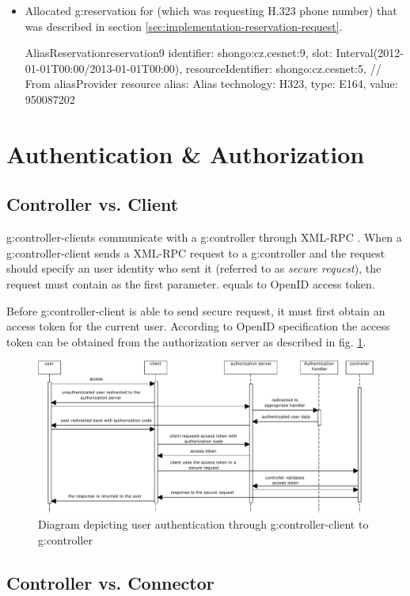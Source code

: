 \begin{itemize}
\item Allocated \gls{g:reservation} for \hyperref[oc:request4]{} (which was requesting H.323 phone number) that was described in section \ref{sec:implementation-reservation-request}.
\begin{ObjectCode}{AliasReservation}{reservation9}{}
identifier: shongo:cz.cesnet:9,
slot: Interval(2012-01-01T00:00/2013-01-01T00:00),
resourceIdentifier: shongo:cz.cesnet:5, // From aliasProvider resource
alias: Alias { 
  technology: H323, 
  type: E164, 
  value: 950087202 
}
\end{ObjectCode}

\end{itemize}



\section{Authentication \& Authorization}
\label{sec:implementation-authorization}

\subsection{Controller vs. Client}
\Glspl{g:controller-client} communicate with a \gls{g:controller} through XML-RPC \cite{xml-rpc}. When a \gls{g:controller-client} sends a XML-RPC request to a \gls{g:controller} and the request should specify an user identity who sent it (referred to as \emph{secure request}), the request must contain  as the first parameter.  equals to OpenID \cite{openid} access token.

Before \gls{g:controller-client} is able to send secure request, it must first obtain an access token for the current user. According to OpenID specification the access token can be obtained from the authorization server as described in fig. \ref{fig:sd_controller_client_authentication}.

\begin{figure}[ht!]
\includegraphics[width=\textwidth]{diagrams/sd_controller_client_authentication}
\caption{Diagram depicting user authentication through \gls{g:controller-client} to \gls{g:controller}}
\label{fig:sd_controller_client_authentication}
\end{figure}


\subsection{Controller vs. Connector}


